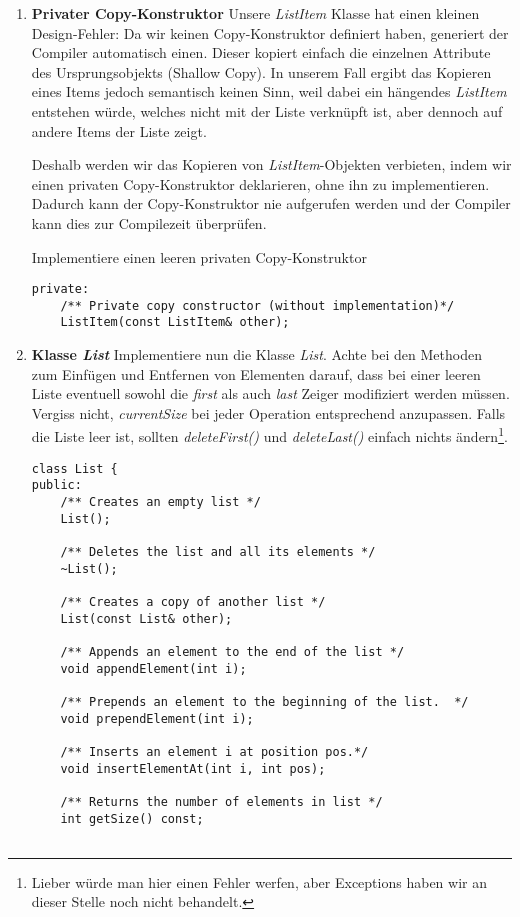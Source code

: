 \begin{enumerate}
\item \textbf{Privater Copy-Konstruktor}
Unsere \emph{ListItem} Klasse hat einen kleinen Design-Fehler:
Da wir keinen Copy-Konstruktor definiert haben, generiert der Compiler automatisch einen.
Dieser kopiert einfach die einzelnen Attribute des Ursprungsobjekts (Shallow Copy).
In unserem Fall ergibt das Kopieren eines Items jedoch semantisch keinen Sinn, weil dabei ein hängendes \emph{ListItem} entstehen würde, welches nicht mit der Liste verknüpft ist, aber dennoch auf andere Items der Liste zeigt. 

Deshalb werden wir das Kopieren von \emph{ListItem}-Objekten verbieten, indem wir einen privaten Copy-Konstruktor deklarieren, ohne ihn zu implementieren.
Dadurch kann der Copy-Konstruktor nie aufgerufen werden und der Compiler kann dies zur Compilezeit überprüfen.

Implementiere einen leeren privaten Copy-Konstruktor
\begin{lstlisting}
private:
	/** Private copy constructor (without implementation)*/
	ListItem(const ListItem& other);
\end{lstlisting}

\item \textbf{Klasse \emph{List}}
Implementiere nun die Klasse \emph{List}.
Achte bei den Methoden zum Einfügen und Entfernen von Elementen darauf, dass bei einer leeren Liste eventuell sowohl die \emph{first} als auch \emph{last} Zeiger modifiziert werden müssen.
Vergiss nicht, \emph{currentSize} bei jeder Operation entsprechend anzupassen.
Falls die Liste leer ist, sollten \emph{deleteFirst()} und \emph{deleteLast()} einfach nichts ändern\footnote{Lieber würde man hier einen Fehler werfen, aber Exceptions haben wir an dieser Stelle noch nicht behandelt.}.
\begin{lstlisting}
class List {
public:
	/** Creates an empty list */
	List();

	/** Deletes the list and all its elements */
	~List();
	
	/** Creates a copy of another list */
	List(const List& other);

	/** Appends an element to the end of the list */
	void appendElement(int i);

	/** Prepends an element to the beginning of the list.  */
	void prependElement(int i);
	
	/** Inserts an element i at position pos.*/
	void insertElementAt(int i, int pos);

	/** Returns the number of elements in list */
	int getSize() const;


\end{lstlisting}
\end{enumerate}
